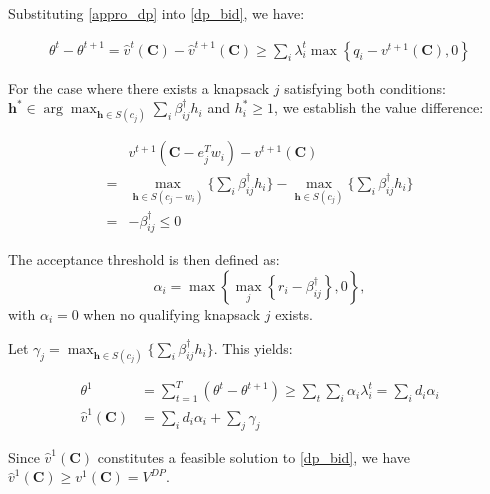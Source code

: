 


Substituting \eqref{appro_dp} into \eqref{dp_bid}, we have:

\begin{align}
    \theta^{t} - \theta^{t+1} = \hat{v}^{t}(\bm{C}) - \hat{v}^{t+1}(\bm{C}) \geq \sum_{i} \lambda_{i}^{t} \max\left\{q_{i} - v^{t+1}(\bm{C}), 0\right\}
\end{align}

For the case where there exists a knapsack $j$ satisfying both conditions: $\bm{h}^{*} \in \arg\max_{\bm{h} \in S(c_j)} \sum_{i} \beta_{ij}^{\dag} h_{i}$ and $h_{i}^{*} \geq 1$, we establish the value difference: 

\begin{align*}
    & v^{t+1}(\bm{C} - e_{j}^{T} w_{i}) - v^{t+1}(\bm{C}) \\ 
  = & \max_{\bm{h} \in S(c_{j}- w_{i})} \{\sum_{i} \beta_{ij}^{\dag} h_{i}\} - \max_{\bm{h} \in S(c_{j})} \{\sum_{i} \beta_{ij}^{\dag} h_{i}\} \\
  = & -\beta_{ij}^{\dag} \leq 0
\end{align*}

The acceptance threshold is then defined as:
$$\alpha_{i} = \max\left\{\max_{j}\left\{r_i - \beta_{ij}^{\dag} \right\}, 0\right\},$$ 
with $\alpha_{i} = 0$ when no qualifying knapsack $j$ exists.

Let $\gamma_{j} = \max_{\bm{h} \in S(c_{j})} \{\sum_{i} \beta_{ij}^{\dag} h_{i}\}$. This yields:

\begin{align*}
    \theta^{1} & = \sum_{t=1}^{T} (\theta^{t} - \theta^{t+1}) \geq \sum_{t} \sum_{i} \alpha_{i} \lambda_{i}^{t} = \sum_{i} d_{i} \alpha_{i} \\
    \hat{v}^{1}(\bm{C}) & = \sum_{i} d_{i} \alpha_{i} + \sum_{j} \gamma_{j}
\end{align*}

Since $\hat{v}^{1}(\bm{C})$ constitutes a feasible solution to \eqref{dp_bid}, we have $\hat{v}^{1}(\bm{C}) \geq v^{1}(\bm{C}) =  V^{DP}$.

